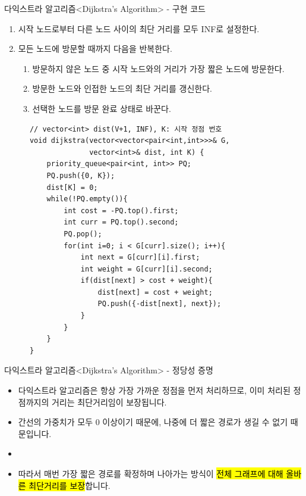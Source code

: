 
\begin{frame}[fragile]{다익스트라 알고리즘}{<Dijkstra's Algorithm> - 구현 코드}
  \begin{twocol}
    \begin{enumerate}
      \item 시작 노드로부터 다른 노드 사이의 최단 거리를 모두 INF로 설정한다.
      \item 모든 노드에 방문할 때까지 다음을 반복한다.
      \begin{enumerate}
        \item 방문하지 않은 노드 중 시작 노드와의 거리가 가장 짧은 노드에 방문한다.
        \item 방문한 노드와 인접한 노드의 최단 거리를 갱신한다.
        \item 선택한 노드를 방문 완료 상태로 바꾼다.
      \end{enumerate}
    \end{enumerate}
  \colsplit
    \begin{verbatim}
      // vector<int> dist(V+1, INF), K: 시작 정점 번호
      void dijkstra(vector<vector<pair<int,int>>>& G,
                    vector<int>& dist, int K) {
          priority_queue<pair<int, int>> PQ;
          PQ.push({0, K});
          dist[K] = 0;
          while(!PQ.empty()){
              int cost = -PQ.top().first;
              int curr = PQ.top().second;
              PQ.pop();
              for(int i=0; i < G[curr].size(); i++){
                  int next = G[curr][i].first;
                  int weight = G[curr][i].second;
                  if(dist[next] > cost + weight){
                      dist[next] = cost + weight;
                      PQ.push({-dist[next], next});
                  }
              }
          }
      }
    \end{verbatim}
  \end{twocol}
\end{frame}

\begin{frame}{다익스트라 알고리즘}{<Dijkstra's Algorithm> - 정당성 증명}
  \vspace{6mm}
  \begin{itemize}
    \item 다익스트라 알고리즘은 항상 가장 가까운 정점을 먼저 처리하므로, 이미 처리된
      정점까지의 거리는 최단거리임이 보장됩니다.
    \item 간선의 가중치가 모두 0 이상이기 때문에, 나중에 더 짧은 경로가 생길 수 없기
      때문입니다.
    \item[] \vspace{1mm}
    \item 따라서 매번 가장 짧은 경로를 확정하며 나아가는 방식이 \hl{전체 그래프에 대해
      올바른 최단거리를 보장}합니다.
  \end{itemize}
\end{frame}

